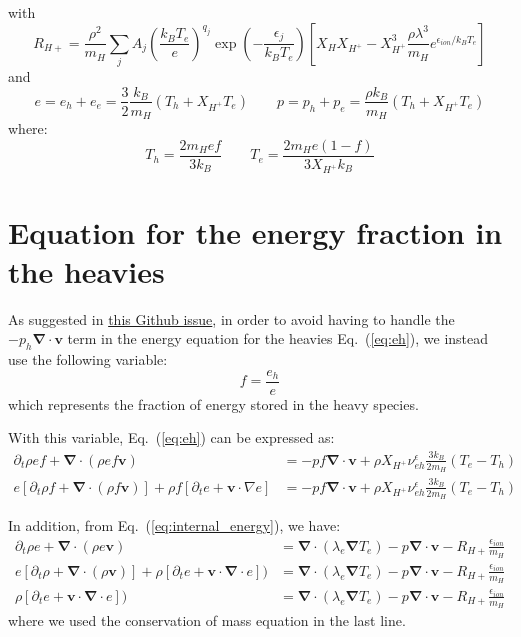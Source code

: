 \documentclass[11pt, oneside]{article}   	%
\begin{document}
with
\[ R_{H+} = \frac{\rho^2}{m_H}\sum_j A_j \left( \frac{k_BT_e}{e} \right)^{q_j}\exp\left( - \frac{\epsilon_j}{k_B T_e} \right)\left[ X_H X_{H^+} - X_{H^+}^3 \frac{\rho \lambda^3}{m_H} e^{\epsilon_{ion}/k_BT_e} \right]  \]
and
\[ e = e_h + e_e =  \frac{3}{2}\frac{k_B}{m_H}(T_h + X_{H^+}T_e) \qquad p = p_h + p_e = \frac{\rho k_B}{m_H}(T_h + X_{H^+}T_e) \]
where:
\[ T_h = \frac{2 m_H e f}{3 k_B} \qquad T_e = \frac{2 m_H e (1 - f)}{3 X_{H^+} k_B} \]


\section{Equation for the energy fraction in the heavies}

As suggested in \href{https://github.com/AMReX-Astro/Castro/issues/2679#issuecomment-1887213580}{this Github issue}, in order to avoid having to handle the $-p_h \boldsymbol{\nabla}\cdot \boldsymbol{v}$ term in the energy equation for the heavies Eq.~(\ref{eq:eh}), we instead use the following variable:
\[ f = \frac{e_h}{e} \]
which represents the fraction of energy stored in the heavy species.

With this variable, Eq.~(\ref{eq:eh}) can be expressed as:
\begin{align*}
\partial_t \rho e f + \boldsymbol{\nabla}\cdot(\rho e f \boldsymbol{v}) &= - p f \boldsymbol{\nabla}\cdot \boldsymbol{v} + \rho X_{H^+}\nu_{eh}^\epsilon \frac{3 k_B}{2 m_H}(T_e - T_h) \\
e\left[\partial_t \rho f + \boldsymbol{\nabla}\cdot(\rho f \boldsymbol{v})\right] + \rho f \left[ \partial_t e + \boldsymbol{v}\cdot\nabla e \right] &= - p f \boldsymbol{\nabla}\cdot \boldsymbol{v} + \rho X_{H^+}\nu_{eh}^\epsilon \frac{3 k_B}{2 m_H}(T_e - T_h)
\end{align*}

In addition, from Eq.~(\ref{eq:internal_energy}), we have:
\begin{align*}
\partial_t \rho e + \boldsymbol{\nabla}\cdot(\rho e \boldsymbol{v}) &= \boldsymbol{\nabla}\cdot(\lambda_e\boldsymbol{\nabla}T_e) - p\boldsymbol{\nabla}\cdot\boldsymbol{v}  -R_{H+} \frac{\epsilon_{ion}}{m_H}  \\
 e \left[ \partial_t \rho + \boldsymbol{\nabla}\cdot(\rho \boldsymbol{v}) \right] + \rho \left[\partial_t  e + \boldsymbol{v}\cdot \boldsymbol{\nabla}\cdot e \right]  ) &= \boldsymbol{\nabla}\cdot(\lambda_e\boldsymbol{\nabla}T_e) - p\boldsymbol{\nabla}\cdot\boldsymbol{v}  -R_{H+} \frac{\epsilon_{ion}}{m_H}  \\
\rho \left[\partial_t  e + \boldsymbol{v}\cdot \boldsymbol{\nabla}\cdot e \right]  ) &= \boldsymbol{\nabla}\cdot(\lambda_e\boldsymbol{\nabla}T_e) - p\boldsymbol{\nabla}\cdot\boldsymbol{v}  -R_{H+} \frac{\epsilon_{ion}}{m_H} 
\end{align*}
where we used the conservation of mass equation in the last line.
\end{document}
